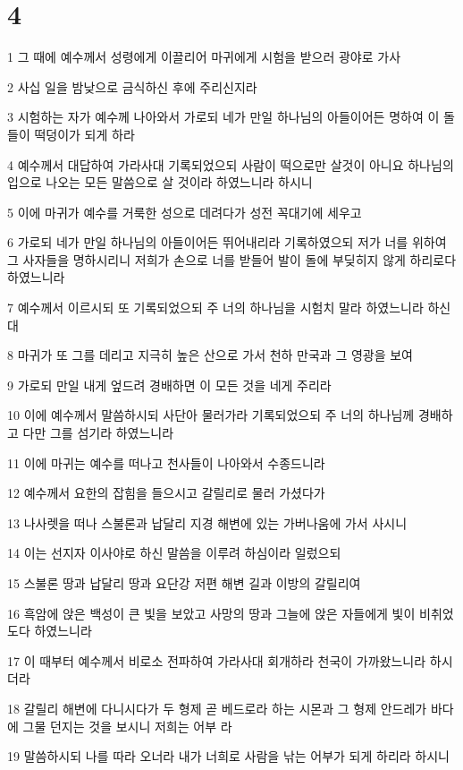 \chapter{4}

\par 1 그 때에 예수께서 성령에게 이끌리어 마귀에게 시험을 받으러 광야로 가사
\par 2 사십 일을 밤낮으로 금식하신 후에 주리신지라
\par 3 시험하는 자가 예수께 나아와서 가로되 네가 만일 하나님의 아들이어든 명하여 이 돌들이 떡덩이가 되게 하라
\par 4 예수께서 대답하여 가라사대 기록되었으되 사람이 떡으로만 살것이 아니요 하나님의 입으로 나오는 모든 말씀으로 살 것이라 하였느니라 하시니
\par 5 이에 마귀가 예수를 거룩한 성으로 데려다가 성전 꼭대기에 세우고
\par 6 가로되 네가 만일 하나님의 아들이어든 뛰어내리라 기록하였으되 저가 너를 위하여 그 사자들을 명하시리니 저희가 손으로 너를 받들어 발이 돌에 부딪히지 않게 하리로다 하였느니라
\par 7 예수께서 이르시되 또 기록되었으되 주 너의 하나님을 시험치 말라 하였느니라 하신대
\par 8 마귀가 또 그를 데리고 지극히 높은 산으로 가서 천하 만국과 그 영광을 보여
\par 9 가로되 만일 내게 엎드려 경배하면 이 모든 것을 네게 주리라
\par 10 이에 예수께서 말씀하시되 사단아 물러가라 기록되었으되 주 너의 하나님께 경배하고 다만 그를 섬기라 하였느니라
\par 11 이에 마귀는 예수를 떠나고 천사들이 나아와서 수종드니라
\par 12 예수께서 요한의 잡힘을 들으시고 갈릴리로 물러 가셨다가
\par 13 나사렛을 떠나 스불론과 납달리 지경 해변에 있는 가버나움에 가서 사시니
\par 14 이는 선지자 이사야로 하신 말씀을 이루려 하심이라 일렀으되
\par 15 스불론 땅과 납달리 땅과 요단강 저편 해변 길과 이방의 갈릴리여
\par 16 흑암에 앉은 백성이 큰 빛을 보았고 사망의 땅과 그늘에 앉은 자들에게 빛이 비취었도다 하였느니라
\par 17 이 때부터 예수께서 비로소 전파하여 가라사대 회개하라 천국이 가까왔느니라 하시더라
\par 18 갈릴리 해변에 다니시다가 두 형제 곧 베드로라 하는 시몬과 그 형제 안드레가 바다에 그물 던지는 것을 보시니 저희는 어부 라
\par 19 말씀하시되 나를 따라 오너라 내가 너희로 사람을 낚는 어부가 되게 하리라 하시니
